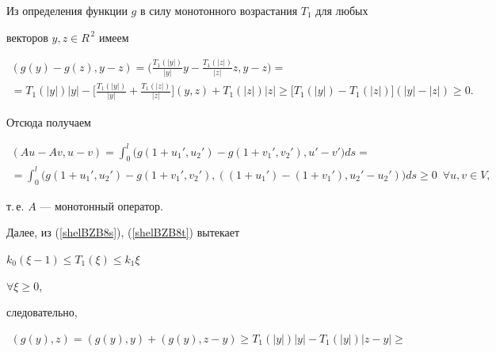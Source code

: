 \begin{pf}


Из определения функции $g$ в силу монотонного возрастания $T_1$ для любых


векторов $y, z \in R^{\,2}$ имеем


\begin{gather*}


(g(y)-g(z), y-z ) =


\bigg(\frac{T_1(|y|)}{|y|} y -


\frac{T_1(|z| )}{|z|} z, y-z \bigg) =\\


%


= T_1(|y| ) |y| -\bigg[ \frac{T_1(|y| )}{|y|} +


\frac{T_1(|z| )}{|z|} \bigg] (y, z)


+ T_1(|z| ) |z| \geq


\big[ T_1(|y| )-T_1(|z| )\big] (|y|-|z| ) \geq 0.


\end{gather*}


Отсюда получаем


\begin{gather*}


(Au-Av,u-v)= \int_{0}^{l}


\big(g(1+u_1',u_2')-g(1+v_1',v_2'), u'-v' \big) ds =\\


%


= \int_{0}^{l}


\big(g(1+u_1',u_2')-g(1+v_1',v_2'),


 ((1+u_1')-(1+v_1'),u_2' -u_2' ) \big) ds \geq 0


\ \; \forall u, v \in V,


\end{gather*}


т.\,е. $A$ --- монотонный оператор.





Далее, из (\ref{shelBZB8s}), (\ref{shelBZB8t}) вытекает


$k_{0} (\xi-1) \leq T_1(\xi) \leq k_{1} \xi$


$\forall \xi \geq 0$,


следовательно,


\begin{multline}


(g(y), z )=(g(y), y )+(g(y), z-y) \geq


T_{1}(| y | ) | y |-T_{1}(| y | ) | z-y | \geq \\



\end{multline}
\end{pf}
